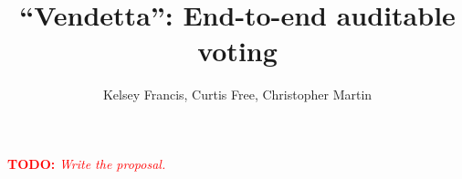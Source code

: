 \documentclass[9pt]{article}
\title{``Vendetta'': End-to-end auditable voting}
\date{}
\author{Kelsey Francis, Curtis Free, Christopher Martin}
\newcommand{\todo}[1]{\textcolor{red}{\textbf{TODO:} \emph{#1}}}
\begin{document}
	\maketitle

	\todo{Write the proposal.}
	\cite{dummy}

	{}
	
\end{document}
